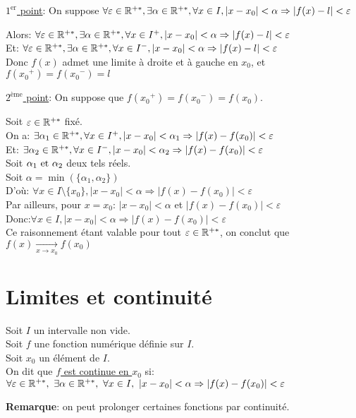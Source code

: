 \documentclass[12pt,twoside,a4paper]{article}
\begin{document}
		\begin{preuve}
			\underline{$1^{\text{er}}$ point}: On suppose $\forall \varepsilon\in\mathbb{R}^{+*},\exists \alpha \in \mathbb{R}^{+*},\forall x\in I,\left|x-x_0 \right|<\alpha \Rightarrow \left| f(x)-l\right| <\varepsilon$
			\begin{tab}
				Alors: $\forall \varepsilon\in\mathbb{R}^{+*},\exists \alpha \in \mathbb{R}^{+*},\forall x\in I^{+},\left|x-x_0 \right|<\alpha \Rightarrow \left| f(x)-l\right| <\varepsilon$\\
				Et: $\forall \varepsilon\in\mathbb{R}^{+*},\exists \alpha \in \mathbb{R}^{+*},\forall x\in I^{-},\left|x-x_0 \right|<\alpha \Rightarrow \left| f(x)-l\right| <\varepsilon$\\
				Donc $f(x)$ admet une limite \`a droite et \`a gauche en $x_0$, et $f({x_0}^{+})=f({x_0}^{-})=l$
			\end{tab}
			\underline{$2^{\text{\`eme}}$ point}: On suppose que $f({x_0}^{+})=f({x_0}^{-})=f(x_0)$.
			\begin{tab}
				Soit $\varepsilon\in \mathbb{R}^{+*}$ fix\'e.\\
				On  a: $\exists \alpha_1 \in \mathbb{R}^{+*},\forall x\in I^{+},\left|x-x_0 \right|<\alpha_1 \Rightarrow \left| f(x)-f(x_0)\right| <\varepsilon$\\
				Et: $\exists \alpha_2 \in \mathbb{R}^{+*},\forall x\in I^{-},\left|x-x_0 \right|<\alpha_2 \Rightarrow \left| f(x)-f(x_0)\right| <\varepsilon$\\
				Soit $\alpha_1\text{ et }\alpha_2$ deux tels r\'eels.\\
				Soit $\alpha=\min(\{\alpha_1, \alpha_2 \})$\\
				D'o\`u: $\forall x\in I\setminus\{x_0\},\left|x-x_0 \right|<\alpha \Rightarrow \left| f(x)-f(x_0)\right| <\varepsilon$\\
				Par ailleurs, pour $x=x_0$: $\left|x-x_0 \right|<\alpha$ et $\left| f(x)-f(x_0)\right| <\varepsilon$\\
				Donc:$\forall x\in I,\left|x-x_0 \right|<\alpha \Rightarrow \left| f(x)-f(x_0)\right| <\varepsilon$\\
				Ce raisonnement \'etant valable pour tout $\varepsilon\in\mathbb{R}^{+*}$, on conclut que $f(x)\mathop{\longrightarrow}\limits_{x\rightarrow x_0} f(x_0)$
			\end{tab}
		\end{preuve}
	\section{Limites et continuit\'e}
		\begin{defi}
			Soit $I$ un intervalle non vide.\\
			Soit $f$ une fonction num\'erique d\'efinie sur $I$.\\
			Soit $x_0$ un \'el\'ement de $I$.\\
			On dit que \underline{$f$ est continue en $x_0$} si:\\
			$\forall \varepsilon \in\R^{+*},\ \exists\alpha\in\R^{+*},\ \forall x\in I,\ |x-x_0|<\alpha\Rightarrow |f(x)-f(x_0)|<\varepsilon$
		\end{defi}
		\begin{flushleft}
			\textbf{Remarque}: on peut prolonger certaines fonctions par continuit\'e.
		\end{flushleft}
\end{document}
